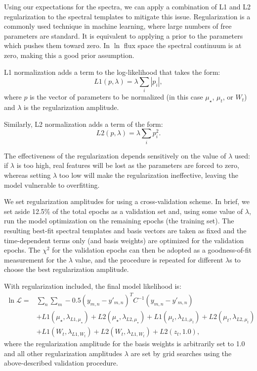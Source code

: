 \documentclass[modern]{aastex62}
\begin{document}
Using our expectations for the spectra, we can apply a combination of L1 and L2 regularization to the spectral templates to mitigate this issue. 
Regularization is a commonly used technique in machine learning, where large numbers of free parameters are standard. 
It is equivalent to applying a prior to the parameters which pushes them toward zero. 
In $\ln$ flux space the spectral continuum is at zero, making this a good prior assumption. 

L1 normalization adds a term to the log-likelihood that takes the form:
$$ L1(p, \lambda) = \lambda \sum_{i} | p_{i} | ,$$
where $p$ is the vector of parameters to be normalized (in this case $\mu_{{\star}}$, $\mu_{{t}}$, or $W_{t}$) and $\lambda$ is the regularization amplitude.

Similarly, L2 normalization adds a term of the form:
$$ L2(p, \lambda) = \lambda \sum_{i} p_{i}^2 .$$

The effectiveness of the regularization depends sensitively on the value of $\lambda$ used: if $\lambda$ is too high, real features will be lost as the parameters are forced to zero, whereas setting $\lambda$ too low will make the regularization ineffective, leaving the model vulnerable to overfitting. 

We set regularization amplitudes for \wobble using a cross-validation scheme. 
In brief, we set aside 12.5\% of the total epochs as a validation set and, using some value of $\lambda$, run the model optimization on the remaining epochs (the training set). 
The resulting best-fit spectral templates and basis vectors are taken as fixed and the time-dependent terms only (\RVs and basis weights) are optimized for the validation epochs. 
The $\chi^2$ for the validation epochs can then be adopted as a goodness-of-fit measurement for the $\lambda$ value, and the procedure is repeated for different $\lambda$s to choose the best regularization amplitude.

With regularization included, the final model likelihood is:
\begin{equation}
\begin{split}
\ln \mathcal{L} = & \sum_{n} \sum_{m} -0.5 (y_{m,n} - y'_{m,n})^T C^{-1} (y_{m,n}-y'_{m,n})  \\
 & + L1(\mu_{\star}, \lambda_{L1, \mu_{\star}}) + L2(\mu_{\star}, \lambda_{L2, \mu_{\star}}) + L1(\mu_{t},  \lambda_{L1, \mu_{t}}) + L2(\mu_{t},  \lambda_{L2, \mu_{t}}) \\
 & + L1(W_t, \lambda_{L1, W_t}) + L2(W_t, \lambda_{L1, W_t}) + L2(z_t, 1.0) ,
\end{split}
\end{equation}
where the regularization amplitude for the basis weights is arbitrarily set to 1.0 and all other regularization amplitudes $\lambda$ are set by grid searches using the above-described validation procedure.  
\end{document}
